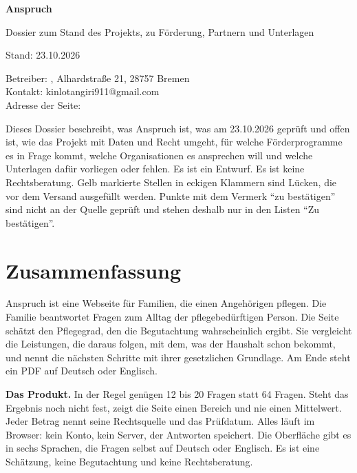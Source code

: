 \documentclass[10pt,parskip=half-]{scrartcl}
\begin{document}
\thispagestyle{plain.scrheadings}
\vspace*{10mm}
{\sffamily\bfseries\Huge Anspruch\par}
\vspace{4mm}
{\sffamily\Large Dossier zum Stand des Projekts, zu Förderung, Partnern und Unterlagen\par}
\vspace{6mm}
{\large Stand: 23.10.2026 \quad\textbullet\quad \draftmark\par}
\vspace{4mm}
Betreiber: , Alhardstraße 21, 28757 Bremen\\
Kontakt: kinlotangiri911@gmail.com\\
Adresse der Seite: 
\vspace{6mm}

\begin{minipage}{\textwidth}\small
Dieses Dossier beschreibt, was Anspruch ist, was am 23.10.2026 geprüft und offen ist, wie das
Projekt mit Daten und Recht umgeht, für welche Förderprogramme es in Frage kommt, welche
Organisationen es ansprechen will und welche Unterlagen dafür vorliegen oder fehlen.
Es ist ein Entwurf. Es ist keine Rechtsberatung. Gelb markierte Stellen in eckigen Klammern
sind Lücken, die vor dem Versand ausgefüllt werden. Punkte mit dem Vermerk \enquote{zu
bestätigen} sind nicht an der Quelle geprüft und stehen deshalb nur in den Listen \enquote{Zu
bestätigen}.
\end{minipage}

\vspace{4mm}
\setcounter{tocdepth}{1}
\tableofcontents
\clearpage

\section{Zusammenfassung}

Anspruch ist eine Webseite für Familien, die einen Angehörigen pflegen. Die Familie beantwortet
Fragen zum Alltag der pflegebedürftigen Person. Die Seite schätzt den Pflegegrad, den die
Begutachtung wahrscheinlich ergibt. Sie vergleicht die Leistungen, die daraus folgen, mit dem,
was der Haushalt schon bekommt, und nennt die nächsten Schritte mit ihrer gesetzlichen
Grundlage. Am Ende steht ein PDF auf Deutsch oder Englisch.

\textbf{Das Produkt.} In der Regel genügen 12 bis 20 Fragen statt 64 Fragen. Steht das Ergebnis noch
nicht fest, zeigt die Seite einen Bereich und nie einen Mittelwert. Jeder Betrag nennt seine
Rechtsquelle und das Prüfdatum. Alles läuft im Browser: kein Konto, kein Server, der Antworten
speichert. Die Oberfläche gibt es in sechs Sprachen, die Fragen selbst auf Deutsch oder
Englisch. Es ist eine Schätzung, keine Begutachtung und keine Rechtsberatung.
\end{document}
